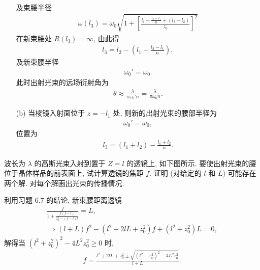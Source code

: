 \documentclass[twoside]{note}
\begin{document}
\begin{sol}
\begin{itemize}
\begin{align}
        \end{align}
        及束腰半径
        \begin{align}
            \omega(l_3)=\omega_0\sqrt{1+\left[\frac{l_1+\frac{l_2-l_1}{n}+(l_3-l_2)}{z_0}\right]^2}
        \end{align}
        在新束腰处 $R(l_3)=\infty$, 由此得
        \begin{align}
            l_3=l_2-\left(l_1+\frac{l_2-l_1}{n}\right),
        \end{align}
        及新束腰半径
        \begin{align}
            \omega_0'=\omega_0.
        \end{align}
        此时出射光束的远场衍射角为
        \begin{align}
            \theta\approx\frac{\lambda}{\pi\omega_0'n}=\frac{\lambda}{\pi\omega_0n}.
        \end{align}
        \item[(b)] 当棱镜入射面位于 $z=-l_1$ 处, 则新的出射光束的腰部半径为
        \begin{align}
            \omega_0'=\omega_0,
        \end{align}
        位置为
        \begin{align}
            l_3=(l_1+l_2)-\frac{l_1+l_2}{n}.
        \end{align}
    \end{itemize}
\end{sol}

\begin{exe}
    波长为 $\lambda$ 的高斯光束入射到置于 $Z=l$ 的透镜上, 如下图所示.
    要使出射光束的腰位于晶体样品的前表面上, 试计算透镜的焦距 $f$. 证明 (对给定的 $l$ 和 $L$) 可能存在两个解. 对每个解画出光束的传播情况.
\end{exe}
\begin{pf}
    利用习题 6.7  的结论, 新束腰距离透镜
    \begin{gather}
        \frac{f}{1+\frac{f(f-l)}{z_0^2-(f-l)l}}=L,\\
        \Longrightarrow(l+L)f^2-(l^2+2lL+z_0^2)f+(l^2+z_0^2)L=0,
    \end{gather}
    解得当 $(l^2+z_0^2)^2-4L^2z_0^2\geq 0$ 时,
    \begin{align}
        f=\frac{l^2+2lL+z_0^2\pm\sqrt{(l^2+z_0^2)^2-4L^2z_0^2}}{l+L}.
    \end{align}
\end{pf}
\end{document}
